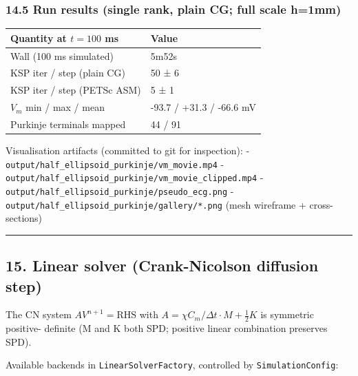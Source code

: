 \documentclass[
  11pt,
]{article}
\begin{document}
\hypertarget{run-results-single-rank-plain-cg-full-scale-h1mm}{%
\subsubsection{14.5 Run results (single rank, plain CG; full scale
h=1mm)}\label{run-results-single-rank-plain-cg-full-scale-h1mm}}

\begin{longtable}[]{@{}ll@{}}
\toprule\noalign{}
Quantity at \(t=100\) ms & Value \\
\midrule\noalign{}
\endhead
\bottomrule\noalign{}
\endlastfoot
Wall (100 ms simulated) & 5m52s \\
KSP iter / step (plain CG) & 50 ± 6 \\
KSP iter / step (PETSc ASM) & 5 ± 1 \\
\(V_m\) min / max / mean & -93.7 / +31.3 / -66.6 mV \\
Purkinje terminals mapped & 44 / 91 \\
\end{longtable}

Visualisation artifacts (committed to git for inspection): -
\texttt{output/half\_ellipsoid\_purkinje/vm\_movie.mp4} -
\texttt{output/half\_ellipsoid\_purkinje/vm\_movie\_clipped.mp4} -
\texttt{output/half\_ellipsoid\_purkinje/pseudo\_ecg.png} -
\texttt{output/half\_ellipsoid\_purkinje/gallery/*.png} (mesh wireframe
+ cross-sections)

\begin{center}\rule{0.5\linewidth}{0.5pt}\end{center}

\hypertarget{linear-solver-crank-nicolson-diffusion-step}{%
\subsection{15. Linear solver (Crank-Nicolson diffusion
step)}\label{linear-solver-crank-nicolson-diffusion-step}}

The CN system \(A V^{n+1} = \mathrm{RHS}\) with
\(A = \chi C_m / \Delta t \cdot M + \tfrac{1}{2} K\) is symmetric
positive- definite (M and K both SPD; positive linear combination
preserves SPD).

Available backends in \texttt{LinearSolverFactory}, controlled by
\texttt{SimulationConfig}:
\end{document}
